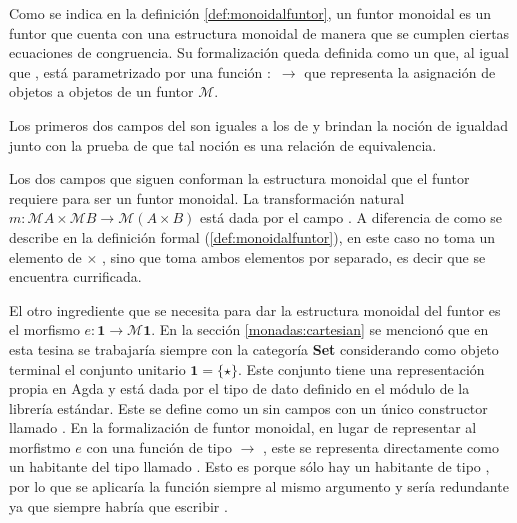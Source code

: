 Como se indica en la definición \ref{def:monoidalfuntor}, un funtor monoidal es un funtor que cuenta con una estructura monoidal de manera que se cumplen ciertas ecuaciones de congruencia. Su formalización queda definida como un  que, al igual que , está parametrizado por una función  $:$  $\rightarrow$  que representa la asignación de objetos a objetos de un funtor $\mathcal{M}$. 


Los primeros dos campos del  son iguales a los de  y brindan la noción de igualdad junto con la prueba de que tal noción es una relación de equivalencia. 

Los dos campos que siguen conforman la estructura monoidal que el funtor requiere para ser un funtor monoidal. La transformación natural $m : \mathcal{M} A \times \mathcal{M} B \rightarrow \mathcal{M} (A \times B)$ está dada por el campo . A diferencia de como se describe en la definición formal (\ref{def:monoidalfuntor}), en este caso  no toma un elemento de  $\times$ , sino que toma ambos elementos por separado, es decir que se encuentra currificada. 

El otro ingrediente que se necesita para dar la estructura monoidal del funtor es el morfismo $e : \mathbf{1} \rightarrow \mathcal{M} \mathbf{1}$. En la sección \ref{monadas:cartesian} se mencionó que en esta tesina se trabajaría siempre con la categoría \textbf{Set} considerando como objeto terminal el conjunto unitario $\mathbf{1} = \{\star\}$. Este conjunto tiene una representación propia en Agda y está dada por el tipo de dato \AgdaDatatype{$\top$} definido en el módulo \href{https://agda.github.io/agda-stdlib/Data.Unit.Base.html}{} de la librería estándar. Este se define como un  sin campos con un único constructor llamado . En la formalización de funtor monoidal, en lugar de representar al morfistmo $e$ con una función de tipo \AgdaDatatype{$\top$} $\rightarrow$  \AgdaDatatype{$\top$}, este se representa directamente como un habitante del tipo  \AgdaDatatype{$\top$} llamado . Esto es porque sólo hay un habitante de tipo \AgdaDatatype{$\top$}, por lo que se aplicaría la función siempre al mismo argumento y sería redundante ya que siempre habría que escribir  .

